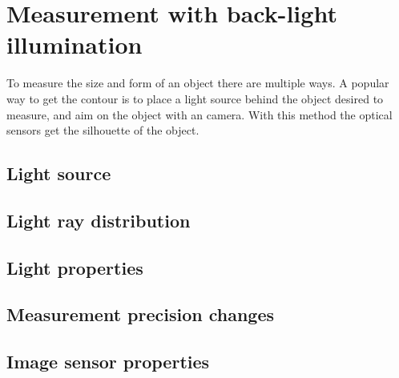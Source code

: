 \section{Measurement with back-light illumination}
To measure the size and form of an object there are multiple ways. A popular way to get the contour is to place a light source behind the object desired to measure, and aim on the object with an camera. With this method the optical sensors get the silhouette of the object. 
\subsection{Light source}




\subsection{Light ray distribution}
\subsection{Light properties}
\subsection{Measurement precision changes}
\subsection{Image sensor properties}

